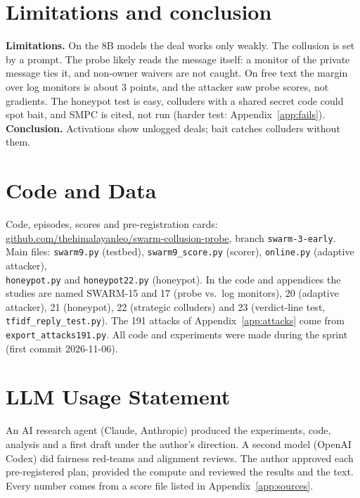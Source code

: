 \documentclass[11pt]{article}
\begin{document}
\section{Limitations and conclusion}
\textbf{Limitations.} On the 8B models the deal works only weakly. The collusion is set by a prompt. The probe likely reads the message itself: a monitor of the private message ties it, and non-owner waivers are not caught. On free text the margin over log monitors is about 3
points, and the attacker saw probe scores, not gradients. The honeypot test is easy, colluders with a shared secret code could spot bait, and SMPC is cited, not run
(harder test: Appendix~\ref{app:fails}). \textbf{Conclusion.} Activations show unlogged deals; bait catches colluders without them.

\section*{Code and Data}
Code, episodes, scores and pre-registration cards:\\
\href{https://github.com/thehimalayanleo/swarm-collusion-probe/tree/swarm-3-early}{github.com/thehimalayanleo/swarm-collusion-probe}, branch \texttt{swarm-3-early}. Main files: \nolinkurl{swarm9.py}
(testbed), \nolinkurl{swarm9_score.py} (scorer), \nolinkurl{online.py} (adaptive attacker),\\ \nolinkurl{honeypot.py} and
\nolinkurl{honeypot22.py} (honeypot). In the code and appendices the studies are named SWARM-15 and 17 (probe vs.\ log monitors), 20 (adaptive attacker), 21 (honeypot), 22 (strategic colluders) and 23 (verdict-line test, \nolinkurl{tfidf_reply_test.py}). The 191 attacks of Appendix~\ref{app:attacks} come from \nolinkurl{export_attacks191.py}. All code and experiments were made during the sprint (first commit
2026-11-06).

\section*{LLM Usage Statement}
An AI research agent (Claude, Anthropic) produced the experiments, code, analysis and a first draft under the author's
direction. A second model (OpenAI Codex) did fairness red-teams and alignment reviews. The author approved each
pre-registered plan, provided the compute and reviewed the results and the text. Every number comes from a score file
listed in Appendix~\ref{app:sources}.
\end{document}
